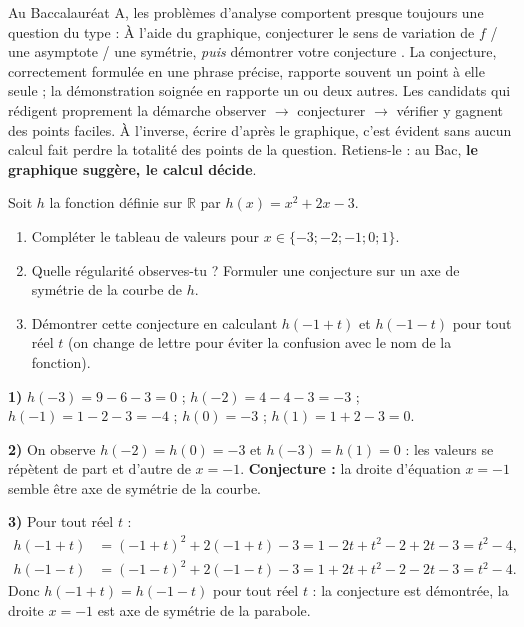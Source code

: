 \documentclass[11pt]{article}
\begin{document}
\begin{savaistu}
Au Baccalauréat A, les problèmes d'analyse comportent presque toujours une question du type : \og À l'aide du graphique, conjecturer le sens de variation de $f$ / une asymptote / une symétrie, \emph{puis} démontrer votre conjecture \fg{}. La conjecture, correctement formulée en une phrase précise, rapporte souvent un point à elle seule ; la démonstration soignée en rapporte un ou deux autres. Les candidats qui rédigent proprement la démarche \og observer $\to$ conjecturer $\to$ vérifier \fg{} y gagnent des points faciles. À l'inverse, écrire \og d'après le graphique, c'est évident \fg{} sans aucun calcul fait perdre la totalité des points de la question. Retiens-le : au Bac, \textbf{le graphique suggère, le calcul décide}.
\end{savaistu}

\begin{exercice}
Soit $h$ la fonction définie sur $\mathbb{R}$ par $h(x) = x^2 + 2x - 3$.
\begin{enumerate}
\item Compléter le tableau de valeurs pour $x \in \{-3 ; -2 ; -1 ; 0 ; 1\}$.
\item Quelle régularité observes-tu ? Formuler une conjecture sur un axe de symétrie de la courbe de $h$.
\item Démontrer cette conjecture en calculant $h(-1 + t)$ et $h(-1 - t)$ pour tout réel $t$ (on change de lettre pour éviter la confusion avec le nom de la fonction).
\end{enumerate}
\end{exercice}

\begin{corrige}[Exercice 1]
\textbf{1)} $h(-3) = 9 - 6 - 3 = 0$ ; $h(-2) = 4 - 4 - 3 = -3$ ; $h(-1) = 1 - 2 - 3 = -4$ ; $h(0) = -3$ ; $h(1) = 1 + 2 - 3 = 0$.
\par\textbf{2)} On observe $h(-2) = h(0) = -3$ et $h(-3) = h(1) = 0$ : les valeurs se répètent de part et d'autre de $x = -1$. \textbf{Conjecture :} la droite d'équation $x = -1$ semble être axe de symétrie de la courbe.
\par\textbf{3)} Pour tout réel $t$ :
\begin{align*}
h(-1 + t) &= (-1+t)^2 + 2(-1+t) - 3 = 1 - 2t + t^2 - 2 + 2t - 3 = t^2 - 4, \\
h(-1 - t) &= (-1-t)^2 + 2(-1-t) - 3 = 1 + 2t + t^2 - 2 - 2t - 3 = t^2 - 4.
\end{align*}
Donc $h(-1+t) = h(-1-t)$ pour tout réel $t$ : la conjecture est démontrée, la droite $x = -1$ est axe de symétrie de la parabole.
\end{corrige}
\end{document}
